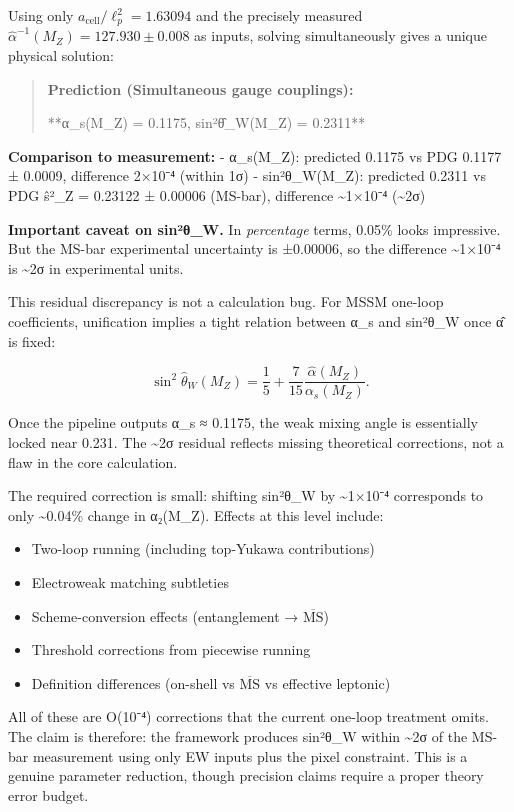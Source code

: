 \documentclass[
]{article}
\providecommand{\tightlist}{%
  \setlength{\itemsep}{0pt}\setlength{\parskip}{0pt}}
\begin{document}
Using only \(a_{\mathrm{cell}}/\ell_p^2 = 1.63094\) and the precisely
measured \(\hat{\alpha}^{-1}(M_Z) = 127.930 \pm 0.008\) as inputs,
solving simultaneously gives a unique physical solution:

\begin{quote}
\textbf{Prediction (Simultaneous gauge couplings):}

**α\_s(M\_Z) = 0.1175, sin²θ̂\_W(M\_Z) = 0.2311**
\end{quote}

\textbf{Comparison to measurement:} - α\_s(M\_Z): predicted 0.1175 vs
PDG 0.1177 ± 0.0009, difference 2×10⁻⁴ (within 1σ) - sin²θ\_W(M\_Z):
predicted 0.2311 vs PDG ŝ²\_Z = 0.23122 ± 0.00006 (MS-bar), difference
\textasciitilde1×10⁻⁴ (\textasciitilde2σ)

\textbf{Important caveat on sin²θ\_W.} In \emph{percentage} terms,
0.05\% looks impressive. But the MS-bar experimental uncertainty is
±0.00006, so the difference \textasciitilde1×10⁻⁴ is \textasciitilde2σ
in experimental units.

This residual discrepancy is not a calculation bug. For MSSM one-loop
coefficients, unification implies a tight relation between α\_s and
sin²θ\_W once α̂ is fixed:

\[
\sin^2\hat{\theta}_W(M_Z) = \frac{1}{5} + \frac{7}{15}\frac{\hat{\alpha}(M_Z)}{\alpha_s(M_Z)}.
\]

Once the pipeline outputs α\_s ≈ 0.1175, the weak mixing angle is
essentially locked near 0.231. The \textasciitilde2σ residual reflects
missing theoretical corrections, not a flaw in the core calculation.

The required correction is small: shifting sin²θ\_W by
\textasciitilde1×10⁻⁴ corresponds to only \textasciitilde0.04\% change
in α₂(M\_Z). Effects at this level include:

\begin{itemize}
\tightlist
\item
  Two-loop running (including top-Yukawa contributions)
\item
  Electroweak matching subtleties
\item
  Scheme-conversion effects (entanglement → \(\overline{\text{MS}}\))
\item
  Threshold corrections from piecewise running
\item
  Definition differences (on-shell vs \(\overline{\text{MS}}\) vs
  effective leptonic)
\end{itemize}

All of these are O(10⁻⁴) corrections that the current one-loop treatment
omits. The claim is therefore: the framework produces sin²θ\_W within
\textasciitilde2σ of the MS-bar measurement using only EW inputs plus
the pixel constraint. This is a genuine parameter reduction, though
precision claims require a proper theory error budget.
\end{document}
